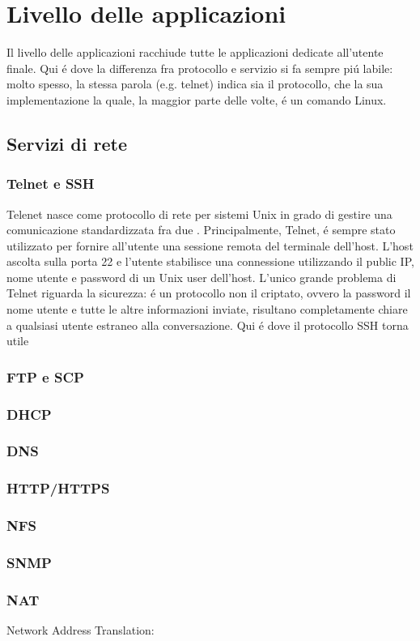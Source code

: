 \documentclass[a4paper,11pt]{article}
\def\sec#1{\section{#1}\label{#1}}
\def\sub#1{\subsection{#1}\label{#1}}
\def\subsub#1{\subsubsection{#1}\label{#1}}
\def\vedi#1{\nameref{#1}}
\begin{document}
\sec{Livello delle applicazioni}
Il livello delle applicazioni racchiude tutte le applicazioni dedicate all'utente finale. 
Qui \'e dove la differenza fra protocollo e servizio si fa sempre pi\'u labile: molto spesso, la stessa parola (e.g. telnet) indica sia il protocollo, che la sua implementazione la quale, la maggior parte delle volte, \'e un comando Linux. 
\sub{Servizi di rete}
\subsub{Telnet e SSH} %
Telenet nasce come protocollo di rete per sistemi Unix in grado di gestire una comunicazione standardizzata fra due \vedi{DTE}. Principalmente, Telnet, \'e sempre stato utilizzato per fornire all'utente una sessione remota del terminale dell'host. L'host ascolta sulla porta 22 e l'utente stabilisce una connessione utilizzando il public IP, nome utente e password di un Unix user dell'host. L'unico grande problema di Telnet riguarda la sicurezza: \'e un protocollo non il criptato, ovvero la password il nome utente e tutte le altre informazioni inviate, risultano completamente chiare a qualsiasi utente estraneo alla conversazione.
Qui \'e dove il protocollo SSH torna utile
\subsub{FTP e SCP} %
\subsub{DHCP} %
\subsub{DNS} 
\subsub{HTTP/HTTPS} 
\subsub{NFS}
\subsub{SNMP} %
\subsub{NAT}
Network Address Translation:
\end{document}
